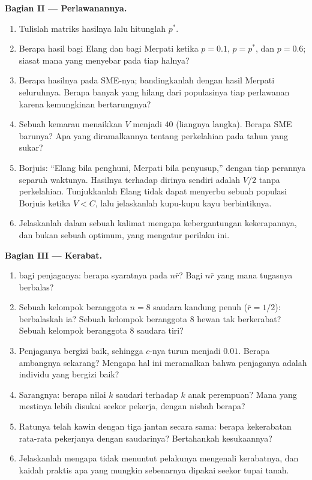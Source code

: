\begin{problem}
\medskip
\noindent\textbf{Bagian II --- Perlawanannya.}
\begin{enumerate}[resume]
  \item Tulislah matriks hasilnya lalu hitunglah $p^{*}$.
  \item Berapa hasil bagi Elang dan bagi Merpati ketika $p = 0.1$, $p = p^{*}$, dan $p =
        0.6$; siasat mana yang menyebar pada tiap halnya?
  \item Berapa hasilnya pada SME-nya; bandingkanlah dengan hasil Merpati seluruhnya. Berapa banyak
        yang hilang dari populasinya tiap perlawanan karena kemungkinan
        bertarungnya?
  \item Sebuah kemarau menaikkan $V$ menjadi $40$ (liangnya langka). Berapa SME barunya? Apa
        yang diramalkannya tentang perkelahian pada tahun yang sukar?
  \item Borjuis: ``Elang bila penghuni, Merpati bila penyusup,'' dengan tiap perannya
        separuh waktunya. Hasilnya terhadap dirinya sendiri adalah $V/2$ tanpa
        perkelahian. Tunjukkanlah Elang tidak dapat menyerbu sebuah populasi Borjuis ketika $V
        < C$, lalu jelaskanlah kupu-kupu kayu berbintiknya.
  \item Jelaskanlah dalam sebuah kalimat mengapa kebergantungan kekerapannya, dan bukan sebuah
        optimum, yang mengatur perilaku ini.
\end{enumerate}

\medskip
\noindent\textbf{Bagian III --- Kerabat.}
\begin{enumerate}[resume]
  \item {} bagi penjaganya: berapa syaratnya pada $n\bar r$? Bagi
        $n\bar r$ yang mana tugasnya berbalas?
  \item Sebuah kelompok beranggota $n = 8$ saudara kandung penuh ($\bar r = 1/2$): berbalaskah ia?
        Sebuah kelompok beranggota 8 hewan tak berkerabat? Sebuah kelompok beranggota 8 saudara tiri?
  \item Penjaganya bergizi baik, sehingga $c$-nya turun menjadi $0.01$. Berapa ambangnya
        sekarang? Mengapa hal ini meramalkan bahwa penjaganya adalah individu
        yang bergizi baik?
  \item Sarangnya: berapa nilai  $k$ saudari terhadap $k$
        anak perempuan? Mana yang mestinya lebih disukai seekor pekerja, dengan nisbah berapa?
  \item Ratunya telah kawin dengan tiga jantan secara sama: berapa kekerabatan rata-rata
        pekerjanya dengan saudarinya? Bertahankah kesukaannya?
  \item Jelaskanlah mengapa  tidak menuntut pelakunya
        mengenali kerabatnya, dan kaidah praktis apa yang mungkin sebenarnya dipakai seekor tupai tanah.
\end{enumerate}


\end{problem}
